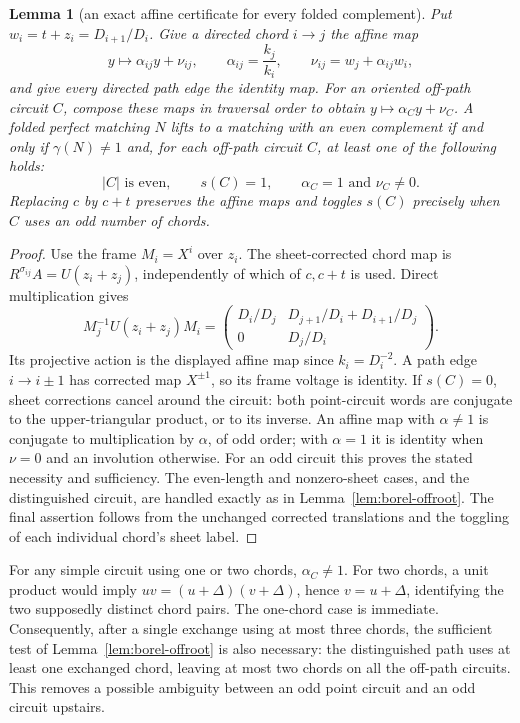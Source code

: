 \documentclass[11pt,a4paper]{article}
\newtheorem{lemma}[theorem]{Lemma}
\theoremstyle{definition}
\theoremstyle{remark}
\begin{document}
\begin{lemma}[an exact affine certificate for every folded complement]\label{lem:borel-affine}
Put $w_i=t+z_i=D_{i+1}/D_i$.  Give a directed chord $i\to j$ the affine map
\[
 y\longmapsto\alpha_{ij}y+\nu_{ij},\qquad
 \alpha_{ij}=\frac{k_j}{k_i},\qquad
 \nu_{ij}=w_j+\alpha_{ij}w_i,
\]
and give every directed path edge the identity map.  For an oriented off-path circuit $C$, compose these maps in traversal order to obtain $y\mapsto\alpha_Cy+\nu_C$.  A folded perfect matching $N$ lifts to a matching with an even complement if and only if $\gamma(N)\ne1$ and, for each off-path circuit $C$, at least one of the following holds:
\[
 |C|\text{ is even},\qquad s(C)=1,\qquad
                    \alpha_C=1\text{ and }\nu_C\ne0.
\]
Replacing $c$ by $c+t$ preserves the affine maps and toggles $s(C)$ precisely when $C$ uses an odd number of chords.
\end{lemma}
\begin{proof}
Use the frame $M_i=X^i$ over $z_i$.  The sheet-corrected chord map is
$R^{\sigma_{ij}}A=U(z_i+z_j)$, independently of which of $c,c+t$ is used.  Direct multiplication gives
\[
 M_j^{-1}U(z_i+z_j)M_i
 =\begin{pmatrix}
 D_i/D_j & D_{j+1}/D_i+D_{i+1}/D_j\\
 0 & D_j/D_i
 \end{pmatrix}.
\]
Its projective action is the displayed affine map since $k_i=D_i^{-2}$.  A path edge $i\to i\pm1$ has corrected map $X^{\pm1}$, so its frame voltage is identity.  If $s(C)=0$, sheet corrections cancel around the circuit: both point-circuit words are conjugate to the upper-triangular product, or to its inverse.  An affine map with $\alpha\ne1$ is conjugate to multiplication by $\alpha$, of odd order; with $\alpha=1$ it is identity when $\nu=0$ and an involution otherwise.  For an odd circuit this proves the stated necessity and sufficiency.  The even-length and nonzero-sheet cases, and the distinguished circuit, are handled exactly as in Lemma~\ref{lem:borel-offroot}.  The final assertion follows from the unchanged corrected translations and the toggling of each individual chord's sheet label.
\end{proof}

For any simple circuit using one or two chords, $\alpha_C\ne1$.  For two chords, a unit product would imply $uv=(u+\Delta)(v+\Delta)$, hence $v=u+\Delta$, identifying the two supposedly distinct chord pairs.  The one-chord case is immediate.  Consequently, after a single exchange using at most three chords, the sufficient test of Lemma~\ref{lem:borel-offroot} is also necessary: the distinguished path uses at least one exchanged chord, leaving at most two chords on all the off-path circuits.  This removes a possible ambiguity between an odd point circuit and an odd circuit upstairs.
\end{document}
